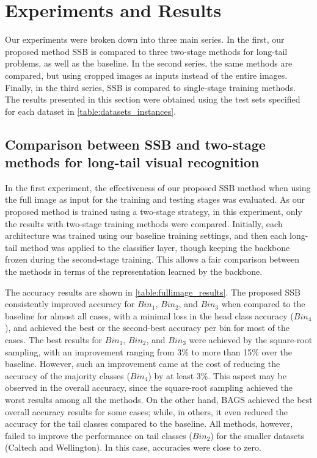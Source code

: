 \section{Experiments and Results}
Our experiments were broken down into three main series. In the first, our
proposed method SSB is compared to three two-stage methods for long-tail
problems, as well as the baseline. In the second series, the same methods are
compared, but using cropped images as inputs instead of the entire images.
Finally, in the third series, SSB is compared to single-stage training methods.
The results presented in this section were obtained using the test sets
specified for each dataset in \autoref{table:datasets_instances}.

\subsection{Comparison between SSB and two-stage methods for long-tail visual
recognition}

In the first experiment, the effectiveness of our proposed SSB method when
using the full image as input for the training and testing stages was evaluated.
As our proposed method is trained using a two-stage strategy, in this
experiment, only the results with two-stage training methods were compared.
Initially, each architecture was trained using our baseline training settings,
and then each long-tail method was applied to the classifier layer, though
keeping the backbone frozen during the second-stage training. This allows a fair
comparison between the methods in terms of the representation learned by the
backbone.

The accuracy results are shown in \autoref{table:fullimage_results}. The
proposed SSB consistently improved accuracy for $Bin_1$, $Bin_2$, and $Bin_3$
when compared to the baseline for almost all cases, with a minimal loss in the
head class accuracy ($Bin_4$), and achieved the best or the second-best
accuracy per bin for most of the cases. The best results for $Bin_1$, $Bin_2$,
and $Bin_3$ were achieved by the square-root sampling, with an improvement
ranging from 3\% to more than 15\% over the baseline. However, such an
improvement came at the cost of reducing the accuracy of the majority classes
($Bin_4$) by at least 3\%. This aspect may be observed in the overall accuracy,
since the square-root sampling achieved the worst results among all the methods.
On the other hand, BAGS achieved the best overall accuracy results for some
cases; while, in others, it even reduced the accuracy for the tail classes
compared to the baseline.  All methods, however, failed to improve the
performance on tail classes ($Bin_2$) for the smaller datasets (Caltech and
Wellington). In this case, accuracies were close to zero.

